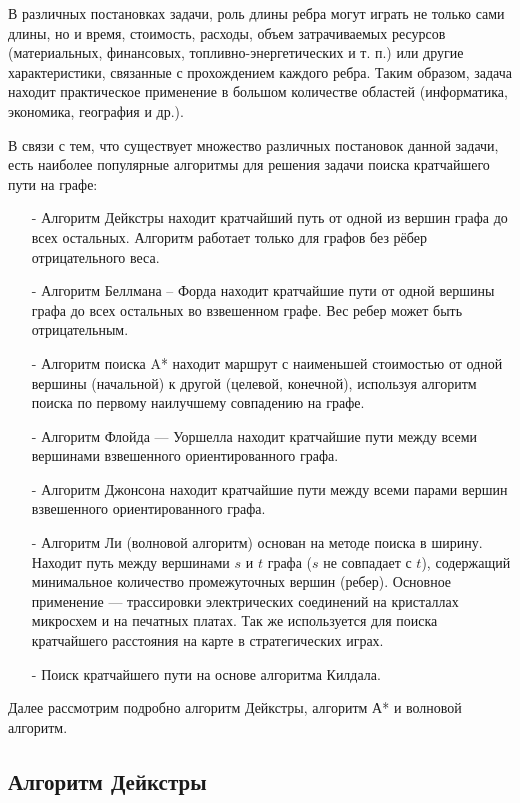 В различных постановках задачи, роль длины ребра могут играть не только сами длины, но и время, стоимость, расходы, объем затрачиваемых ресурсов (материальных, финансовых, топливно-энергетических и т. п.) или другие характеристики, связанные с прохождением каждого ребра. 
Таким образом, задача находит практическое применение в большом количестве областей (информатика, экономика, география и др.).

В связи с тем, что существует множество различных постановок данной задачи, есть наиболее популярные алгоритмы для решения задачи поиска кратчайшего пути на графе:
\begin{itemize}
 \item [-] Алгоритм Дейкстры находит кратчайший путь от одной из вершин графа до всех остальных. 
 Алгоритм работает только для графов без рёбер отрицательного веса.
 \item [-] Алгоритм Беллмана -- Форда находит кратчайшие пути от одной вершины графа до всех остальных во взвешенном графе. 
 Вес ребер может быть отрицательным.
 \item [-] Алгоритм поиска A* находит маршрут с наименьшей стоимостью от одной вершины (начальной) к другой (целевой, конечной), используя алгоритм поиска по первому наилучшему совпадению на графе.
 \item [-] Алгоритм Флойда --- Уоршелла находит кратчайшие пути между всеми вершинами взвешенного ориентированного графа.
 \item [-] Алгоритм Джонсона находит кратчайшие пути между всеми парами вершин взвешенного ориентированного графа.
 \item [-] Алгоритм Ли (волновой алгоритм) основан на методе поиска в ширину. 
 Находит путь между вершинами $s$ и $t$ графа ($s$ не совпадает с $t$), содержащий минимальное количество промежуточных вершин (ребер). 
 Основное применение --- трассировки электрических соединений на кристаллах микросхем и на печатных платах. 
 Так же используется для поиска кратчайшего расстояния на карте в стратегических играх.
 \item [-] Поиск кратчайшего пути на основе алгоритма Килдала.
\end{itemize}

Далее рассмотрим подробно алгоритм Дейкстры, алгоритм А* и волновой алгоритм. 

\subsection{Алгоритм Дейкстры}

